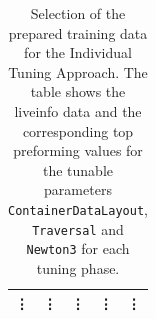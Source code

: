 \begin{table}[h]
\begin{tabular}{|c|c|c|c|c|}
        \vdots                 & \vdots                         & \vdots             & \vdots           & \vdots \\
        \hline
    \end{tabular}
    \caption[Prepared training data for the Individual Tuning Approach]{Selection of the prepared training data for the Individual Tuning Approach. The table shows the liveinfo data and the corresponding top preforming values for the tunable parameters \texttt{ContainerDataLayout}, \texttt{Traversal} and \texttt{Newton3} for each tuning phase.}
    \label{tab:trainingDataIndividual}
\end{table}





